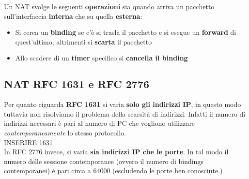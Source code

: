 \documentclass[12pt]{article}
\begin{document}
			Un NAT svolge le seguenti \textbf{operazioni} sia quando arriva un pacchetto sull'interfaccia \textbf{interna} che su quella \textbf{esterna}:
			\begin{itemize}
				\item Si cerca un \textbf{binding} se c'è si trasla il pacchetto e si esegue un \textbf{forward} di quest'ultimo, altrimenti si \textbf{scarta} il pacchetto
				\item Allo scadere di un \textbf{timer} specifico si \textbf{cancella il binding}
			\end{itemize}
		\subsection{NAT RFC 1631 e RFC 2776 }  
			Per quanto riguarda \textbf{RFC 1631} si varia \textbf{solo gli indirizzi IP}, in questo modo tuttavia non risolviamo il problema della scarsità di indirizzi. Infatti il numero di indirizzi necessari è pari al numero di PC che vogliono utilizzare \textit{contemporaneamente} lo stesso protocollo.\\
			
			INSERIRE 1631\\
			
			In RFC 2776 invece, si varia \textbf{sia indirizzi IP che le porte}. In tal modo il numero delle sessione contemporanee (ovvero il numero di bindings contemporanei) è pari circa a 64000 (escludendo le porte ben conosciute.)
\end{document}
